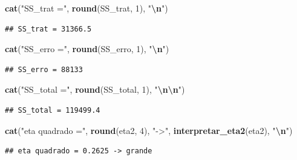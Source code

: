 \documentclass[
]{article}
\newenvironment{Shaded}{\begin{snugshade}}{\end{snugshade}}
\newcommand{\DecValTok}[1]{\textcolor[rgb]{0.00,0.00,0.81}{#1}}
\newcommand{\FunctionTok}[1]{\textcolor[rgb]{0.13,0.29,0.53}{\textbf{#1}}}
\newcommand{\NormalTok}[1]{#1}
\newcommand{\SpecialCharTok}[1]{\textcolor[rgb]{0.81,0.36,0.00}{\textbf{#1}}}
\newcommand{\StringTok}[1]{\textcolor[rgb]{0.31,0.60,0.02}{#1}}
\begin{document}
\begin{Shaded}
\begin{Highlighting}[]
\FunctionTok{cat}\NormalTok{(}\StringTok{"SS\_trat ="}\NormalTok{, }\FunctionTok{round}\NormalTok{(SS\_trat, }\DecValTok{1}\NormalTok{), }\StringTok{"}\SpecialCharTok{\textbackslash{}n}\StringTok{"}\NormalTok{)}
\end{Highlighting}
\end{Shaded}

\begin{verbatim}
## SS_trat = 31366.5
\end{verbatim}

\begin{Shaded}
\begin{Highlighting}[]
\FunctionTok{cat}\NormalTok{(}\StringTok{"SS\_erro ="}\NormalTok{, }\FunctionTok{round}\NormalTok{(SS\_erro, }\DecValTok{1}\NormalTok{), }\StringTok{"}\SpecialCharTok{\textbackslash{}n}\StringTok{"}\NormalTok{)}
\end{Highlighting}
\end{Shaded}

\begin{verbatim}
## SS_erro = 88133
\end{verbatim}

\begin{Shaded}
\begin{Highlighting}[]
\FunctionTok{cat}\NormalTok{(}\StringTok{"SS\_total ="}\NormalTok{, }\FunctionTok{round}\NormalTok{(SS\_total, }\DecValTok{1}\NormalTok{), }\StringTok{"}\SpecialCharTok{\textbackslash{}n\textbackslash{}n}\StringTok{"}\NormalTok{)}
\end{Highlighting}
\end{Shaded}

\begin{verbatim}
## SS_total = 119499.4
\end{verbatim}

\begin{Shaded}
\begin{Highlighting}[]
\FunctionTok{cat}\NormalTok{(}\StringTok{"eta quadrado ="}\NormalTok{, }\FunctionTok{round}\NormalTok{(eta2, }\DecValTok{4}\NormalTok{), }\StringTok{"{-}\textgreater{}"}\NormalTok{, }\FunctionTok{interpretar\_eta2}\NormalTok{(eta2), }\StringTok{"}\SpecialCharTok{\textbackslash{}n}\StringTok{"}\NormalTok{)}
\end{Highlighting}
\end{Shaded}

\begin{verbatim}
## eta quadrado = 0.2625 -> grande
\end{verbatim}
\end{document}
